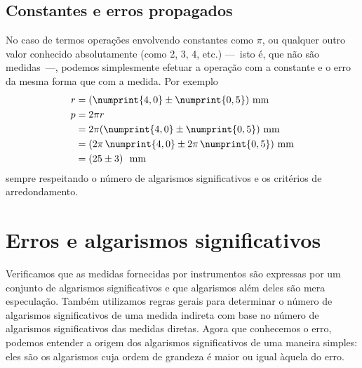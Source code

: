 \subsection{Constantes e erros propagados}

No caso de termos operações envolvendo constantes como $\pi$, ou qualquer outro valor conhecido absolutamente (como 2, 3, 4, etc.) ---~isto é, que não são medidas~---, podemos simplesmente efetuar a operação com a constante e o erro da mesma forma que com a medida. Por exemplo
\begin{align}
     r &= (\numprint{4,0} \pm \numprint{0,5})\textrm{~mm} \\
     p &= 2\pi r \\
     &= 2\pi(\numprint{4,0} \pm \numprint{0,5})\textrm{~mm} \\
     &= (2\pi\,\numprint{4,0} \pm 2\pi\,\numprint{0,5})\textrm{~mm} \\
     &= (25 \pm 3)~\textrm{~mm}
\end{align}
%
sempre respeitando o número de algarismos significativos e os critérios de arredondamento.

\section{Erros e algarismos significativos}

Verificamos que as medidas fornecidas por instrumentos são expressas por um conjunto de algarismos significativos e que algarismos além deles são mera especulação. Também utilizamos regras gerais para determinar o número de algarismos significativos de uma medida indireta com base no número de algarismos significativos das medidas diretas. Agora que conhecemos o erro, podemos entender a origem dos algarismos significativos de uma maneira simples: eles são os algarismos cuja ordem de grandeza é maior ou igual àquela do erro. %

